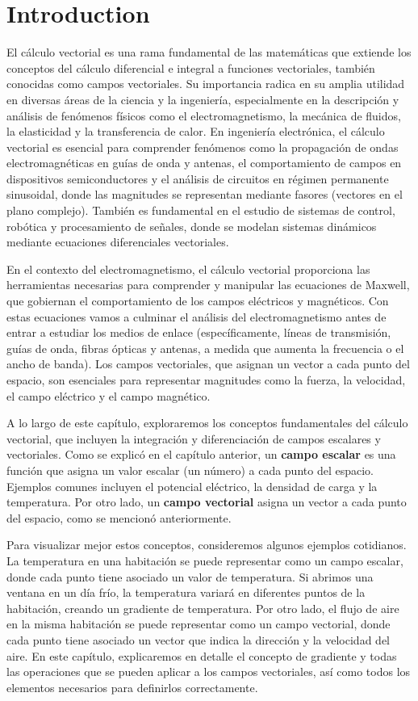 \documentclass{article}
\begin{document}
\section{Introduction}

El cálculo vectorial es una rama fundamental de las matemáticas que extiende los conceptos del cálculo diferencial e integral a funciones vectoriales, también conocidas como campos vectoriales. Su importancia radica en su amplia utilidad en diversas áreas de la ciencia y la ingeniería, especialmente en la descripción y análisis de fenómenos físicos como el electromagnetismo, la mecánica de fluidos, la elasticidad y la transferencia de calor. En ingeniería electrónica, el cálculo vectorial es esencial para comprender fenómenos como la propagación de ondas electromagnéticas en guías de onda y antenas, el comportamiento de campos en dispositivos semiconductores y el análisis de circuitos en régimen permanente sinusoidal, donde las magnitudes se representan mediante fasores (vectores en el plano complejo). También es fundamental en el estudio de sistemas de control, robótica y procesamiento de señales, donde se modelan sistemas dinámicos mediante ecuaciones diferenciales vectoriales.

En el contexto del electromagnetismo, el cálculo vectorial proporciona las herramientas necesarias para comprender y manipular las ecuaciones de Maxwell, que gobiernan el comportamiento de los campos eléctricos y magnéticos. Con estas ecuaciones vamos a culminar el análisis del electromagnetismo antes de entrar a estudiar los medios de enlace (específicamente, líneas de transmisión, guías de onda, fibras ópticas y antenas, a medida que aumenta la frecuencia o el ancho de banda). Los campos vectoriales, que asignan un vector a cada punto del espacio, son esenciales para representar magnitudes como la fuerza, la velocidad, el campo eléctrico y el campo magnético.

A lo largo de este capítulo, exploraremos los conceptos fundamentales del cálculo vectorial, que incluyen la integración y diferenciación de campos escalares y vectoriales. Como se explicó en el capítulo anterior, un \textbf{campo escalar} es una función que asigna un valor escalar (un número) a cada punto del espacio. Ejemplos comunes incluyen el potencial eléctrico, la densidad de carga y la temperatura. Por otro lado, un \textbf{campo vectorial} asigna un vector a cada punto del espacio, como se mencionó anteriormente.

Para visualizar mejor estos conceptos, consideremos algunos ejemplos cotidianos. La temperatura en una habitación se puede representar como un campo escalar, donde cada punto tiene asociado un valor de temperatura. Si abrimos una ventana en un día frío, la temperatura variará en diferentes puntos de la habitación, creando un gradiente de temperatura. Por otro lado, el flujo de aire en la misma habitación se puede representar como un campo vectorial, donde cada punto tiene asociado un vector que indica la dirección y la velocidad del aire. En este capítulo, explicaremos en detalle el concepto de gradiente y todas las operaciones que se pueden aplicar a los campos vectoriales, así como todos los elementos necesarios para definirlos correctamente.
\end{document}
